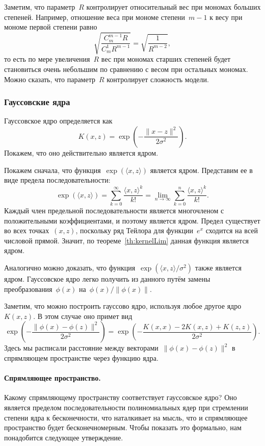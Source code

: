 \documentclass[12pt,fleqn]{article}
\begin{document}
Заметим, что параметр~$R$ контролирует относительный вес при мономах больших степеней.
Например, отношение веса при мономе степени~$m - 1$ к весу при мономе первой степени
равно
\[
    \sqrt{\frac{C_{m}^{m - 1} R}{C_{m}^{1} R^{m - 1}}}
    =
    \sqrt{\frac{1}{R^{m - 2}}},
\]
то есть по мере увеличения~$R$ вес при мономах старших степеней
будет становиться очень небольшим по сравнению с весом при остальных мономах.
Можно сказать, что параметр~$R$ контролирует сложность модели.

\subsubsection{Гауссовские ядра}
Гауссовское ядро определяется как
\[
    K(x, z) = \exp\left( -\frac{\|x - z\|^2}{2 \sigma^2} \right).
\]
Покажем, что оно действительно является ядром.

Покажем сначала, что функция~$\exp(\langle x, z \rangle)$
является ядром.
Представим ее в виде предела последовательности:
\[
    \exp(\langle x, z \rangle)
    =
    \sum_{k = 0}^{\infty}
        \frac{\langle x, z \rangle^k}{k!}
    =
    \lim_{n \to \infty}
        \sum_{k = 0}^{n}
            \frac{\langle x, z \rangle^k}{k!}.
\]
Каждый член предельной последовательности является многочленом
с положительными коэффициентами, и поэтому является ядром.
Предел существует во всех точках~$(x, z)$, поскольку
ряд Тейлора для функции~$e^x$ сходится на всей числовой прямой.
Значит, по теореме~\ref{th:kernelLim} данная функция является ядром.

Аналогично можно доказать, что функция~$\exp(\langle x, z \rangle / \sigma^2)$
также является ядром.
Гауссовское ядро легко получить из данного путём замены преобразования~$\phi(x)$
на~$\phi(x) / \|\phi(x)\|$.

Заметим, что можно построить гауссово ядро, используя любое
другое ядро~$K(x, z)$.
В этом случае оно примет вид
\[
    \exp\left( -\frac{\|\phi(x) - \phi(z)\|^2}{2 \sigma^2} \right)
    =
    \exp\left(
    -\frac{
        K(x, x) - 2 K(x, z) + K(z, z)
    }{
        2 \sigma^2
    }
    \right).
\]
Здесь мы расписали расстояние между векторами~$\|\phi(x) - \phi(z)\|^2$
в спрямляющем пространстве через функцию ядра.

\paragraph{Спрямляющее пространство.}
Какому спрямляющему пространству соответствует гауссовское ядро?
Оно является пределом последовательности полиномиальных ядер
при стремлении степени ядра к бесконечности,
что наталкивает на мысль, что и спрямляющее пространство
будет бесконечномерным.
Чтобы показать это формально, нам понадобится следующее утверждение.
\end{document}
